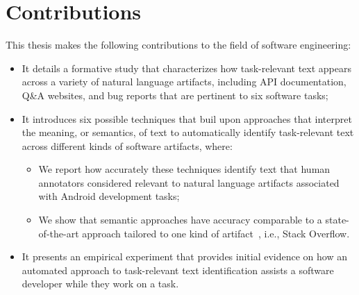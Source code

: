 

\section{Contributions}
\label{cp1:contributions}

This thesis makes the following contributions to the field of software engineering:




\begin{itemize}

    \item It details a formative study that characterizes how task-relevant text appears across a variety of natural language artifacts, including  API documentation, Q\&A websites, and
    bug reports that are pertinent to six software tasks; 

    \item It introduces six possible techniques that buil upon approaches that interpret the meaning, or semantics, of text
    to automatically identify task-relevant text across different kinds of software artifacts, where:

    \begin{itemize}
        
        \item We report how accurately these techniques identify text that human annotators considered relevant to natural language artifacts associated with Android development tasks; 

        \item We show that semantic approaches have accuracy comparable to a state-of-the-art approach
        tailored to one kind of artifact~\cite{Xu2017}, i.e., Stack Overflow.
    \end{itemize}



    \item It presents an empirical experiment that provides initial evidence on how  
    an automated approach to task-relevant text identification assists a software developer while they work on a task.
\end{itemize}











